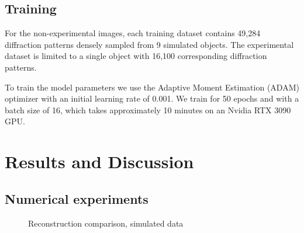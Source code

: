 \documentclass[sn-mathphys]{sn-jnl}%
\theoremstyle{thmstyleone}%
\theoremstyle{thmstyletwo}%
\theoremstyle{thmstylethree}%
\begin{document}
\subsection{Training}
For the non-experimental images, each training dataset contains 49,284 diffraction patterns densely sampled from 9 simulated objects. The experimental dataset is limited to a single object with 16,100 corresponding diffraction patterns. 

To train the model parameters we use the Adaptive Moment Estimation (ADAM) optimizer with an initial learning rate of 0.001.\cite{kingma2014adam} We train for 50 epochs and with a batch size of 16, which takes approximately 10 minutes on an Nvidia RTX 3090 GPU.




\section{Results and Discussion}

\subsection{Numerical experiments}


\begin{figure}%
    \centering
\vfill
    \caption{Reconstruction comparison, simulated data}%
    \label{fig:sim_comparison}%
\end{figure}
\end{document}
